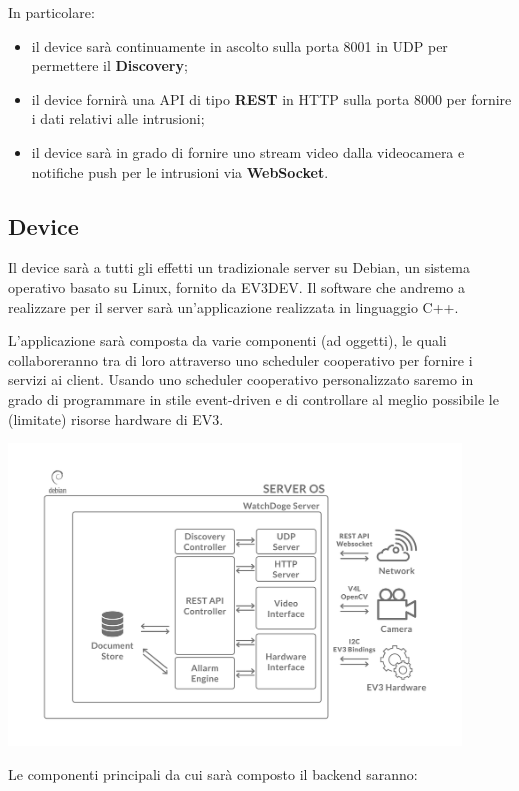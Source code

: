 \documentclass{article}
\begin{document}
In particolare:

\begin{itemize}
    \item il device sarà continuamente in ascolto sulla porta 8001 in UDP per permettere il \textbf{Discovery};
    \item il device fornirà una API di tipo \textbf{REST} in HTTP sulla porta 8000 per fornire i dati relativi alle intrusioni;
    \item il device sarà in grado di fornire uno stream video dalla videocamera e notifiche push per le intrusioni via \textbf{WebSocket}.
\end{itemize}

\subsection{Device}

Il device sarà a tutti gli effetti un tradizionale server su Debian, un sistema operativo basato su Linux, fornito da EV3DEV. Il software che andremo a realizzare per il server sarà un'applicazione realizzata in linguaggio C++.

L'applicazione sarà composta da varie componenti (ad oggetti), le quali collaboreranno tra di loro attraverso uno scheduler cooperativo per fornire i servizi ai client. Usando uno scheduler cooperativo personalizzato saremo in grado di programmare in stile event-driven e di controllare al meglio possibile le (limitate) risorse hardware di EV3.

\begin{center}
\includegraphics[width=12cm]{schema-be.pdf}
\end{center}

Le componenti principali da cui sarà composto il backend saranno:
\end{document}
